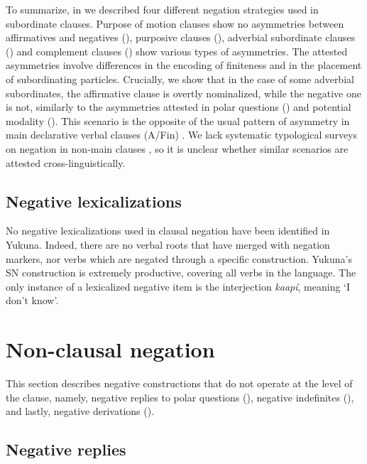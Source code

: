 \documentclass[output=paper,colorlinks,citecolor=brown]{langscibook}
\begin{document}
To summarize, in  we described four different negation strategies used in subordinate clauses. Purpose of motion clauses show no asymmetries between affirmatives and negatives (), purposive clauses (), adverbial subordinate clauses () and complement clauses () show various types of asymmetries. The attested asymmetries involve differences in the encoding of finiteness and in the placement of subordinating particles. Crucially, we show that in the case of some adverbial subordinates, the affirmative clause is overtly nominalized, while the negative one is not, similarly to the asymmetries attested in polar questions () and potential modality (). This scenario is the opposite of the usual pattern of asymmetry in main declarative verbal clauses (A/Fin) \citep[75]{Miestamo2005}. We lack systematic typological surveys on negation in non-main clauses \citep[23--24]{Miestamo2017}, so it is unclear whether similar scenarios are attested cross-linguistically.


\subsection{Negative lexicalizations}

No negative lexicalizations used in clausal negation have been identified in Yukuna. Indeed, there are no verbal roots that have merged with negation markers, nor verbs which are negated through a specific construction. Yukuna's SN construction is extremely productive, covering all verbs in the language. The only instance of a lexicalized negative item is the interjection \textit{kaapí}, meaning `I don’t know’.

\section{Non-clausal negation}

This section describes negative constructions that do not operate at the level of the clause, namely, negative replies to polar questions (), negative indefinites (), and lastly, negative derivations (). 

\subsection{Negative replies} \label{yukuna:negrep}
\end{document}
